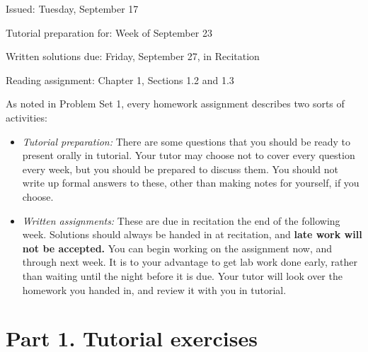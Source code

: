 
\def\fbox#1{%
  \vtop{\vbox{\hrule%
     \hbox{\vrule\kern3pt%
 \vtop{\vbox{\kern3pt#1}\kern3pt}%
 \kern3pt\vrule}}%
 \hrule}}






\noindent
Issued: Tuesday, September 17

\noindent
Tutorial preparation for:  Week of September 23

\noindent
Written solutions due: Friday, September 27, in Recitation


\noindent
Reading assignment: Chapter 1, Sections 1.2 and 1.3



\vskip 20pt

As noted in Problem Set 1, every homework assignment describes two
sorts of activities:

\begin{itemize}

\item {\it Tutorial preparation:}  There are some questions that you
should be ready to present orally in tutorial.  Your tutor may choose
not to cover every question every week, but you should be prepared to
discuss them.  You should not write up formal answers to these, other
than making notes for yourself, if you choose.

\item {\it Written assignments:}  These are due in recitation the end
of the following week.  Solutions should always be handed in at
recitation, and {\bf late work will not be accepted.}  You can begin working
on the assignment now, and through next week.  It is to your advantage
to get lab work done early, rather than waiting until the night before
it is due.  Your tutor will look over the homework you handed in, and
review it with you in tutorial.

\end{itemize}

\section{Part 1.  Tutorial exercises}

